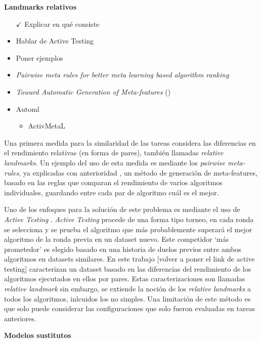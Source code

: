 \quad 

\textbf{Landmarks relativos}

\begin{itemize}
	\item[$\checkmark$] Explicar en qué consiste
	\item Hablar de Active Testing
	\item Poner ejemplos
	\item \textit{Pairwise meta rules for better meta learning based algorithm ranking}
	\item \textit{Toward Automatic Generation of Meta-features} (\cite{pinto2016towards})
	\item Automl \begin{itemize}
		\item ActivMetaL \cite{activmetal}
	\end{itemize}
\end{itemize}

\quad

Una primera medida para la similaridad de las tareas considera las diferencias en el rendimiento relativas (en forma de pares), también llamadas \textit{relative landmarks}. Un ejemplo del uso de esta medida es mediante los \textit{pairwise meta-rules}, ya explicadas con anterioridad \cite{sun2013pairwise}, un método de generación de meta-features, basado en las reglas que comparan el rendimiento de varios algoritmos individuales, guardando entre cada par de algoritmo cuál es el mejor.

Uno de los enfoques para la solución de este problema es mediante el uso de \textit{Active Testing} \cite{leite2017selecting}. \textit{Active Testing} procede de una forma tipo torneo, en cada ronda se selecciona y se prueba el algoritmo que más probablemente superará el mejor algoritmo de la ronda previa en un dataset nuevo. Este competidor `más prometedor' es elegido basado en una historia de duelos previos entre ambos algoritmos en datasets similares. En este trabajo [volver a poner el link de active testing] caracterizan un dataset basado en las diferencias del rendimiento de los algoritmos ejecutados en ellos por pares. Estas caracterizaciones son llamadas \textit{relative landmark} sin embargo, se extiende la noción de los \textit{relative landmarks} a todos los algoritmos, inlcuidos los no simples. Una limitación de este método es que solo puede considerar las configuraciones que solo fueron evaluadas en tareas anteriores.

\quad

\textbf{Modelos sustitutos}

